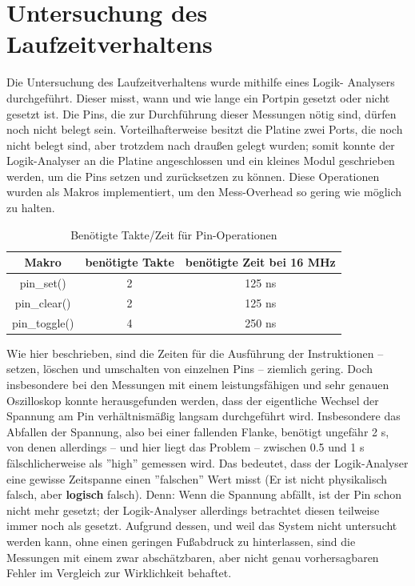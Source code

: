 \chapter{Untersuchung des Laufzeitverhaltens}
Die Untersuchung des Laufzeitverhaltens wurde mithilfe eines Logik-
Analysers durchgeführt. Dieser misst, wann und wie lange
ein Portpin gesetzt oder nicht gesetzt ist. Die Pins, die zur Durchführung
dieser Messungen nötig sind, dürfen noch nicht belegt sein. Vorteilhafterweise
besitzt die Platine zwei Ports, die noch nicht belegt sind, aber
trotzdem nach draußen gelegt wurden; somit konnte der Logik-Analyser
an die Platine angeschlossen und ein kleines Modul
geschrieben werden, um die Pins setzen und zurücksetzen zu
können. Diese Operationen wurden als Makros implementiert, um den
Mess-Overhead so gering wie möglich zu halten.
\begin{table}[htb]
\begin{center}
	\begin{tabular}{|c||c|c|}
		\hline
		\textbf{Makro} & \textbf{benötigte Takte} & \textbf{benötigte Zeit bei 16 MHz} \\ \hline \hline
		pin\_set() & 2 & 125 ns \\ \hline
		pin\_clear() & 2 & 125 ns \\ \hline
		pin\_toggle() & 4 & 250 ns \\ \hline
	\end{tabular}
	\caption{\label{pin_takte} Benötigte Takte/Zeit für Pin-Operationen}
\end{center}
\end{table}
Wie hier beschrieben, sind die Zeiten für die Ausführung der Instruktionen
-- setzen, löschen und umschalten von einzelnen Pins -- ziemlich gering.
Doch insbesondere bei den Messungen mit einem leistungsfähigen und
sehr genauen Oszilloskop konnte herausgefunden werden, dass der eigentliche
Wechsel der Spannung am Pin verhältnismäßig langsam durchgeführt wird.
Insbesondere das Abfallen der Spannung, also bei einer fallenden Flanke,
benötigt ungefähr 2 \textmu{}s, von denen allerdings -- und hier liegt das Problem -- zwischen
0.5 und 1 \textmu{}s fälschlicherweise als ''high'' gemessen wird.
Das bedeutet, dass der Logik-Analyser eine gewisse Zeitspanne einen ''falschen''
Wert misst (Er ist nicht physikalisch falsch, aber \textbf{logisch} falsch).
Denn: Wenn die Spannung abfällt, ist der Pin schon nicht mehr gesetzt; der
Logik-Analyser allerdings betrachtet diesen teilweise immer noch als gesetzt.
Aufgrund dessen, und weil das System nicht untersucht
werden kann, ohne einen geringen Fußabdruck zu hinterlassen, sind die Messungen mit
einem zwar abschätzbaren, aber nicht genau vorhersagbaren Fehler im Vergleich zur
Wirklichkeit behaftet.

